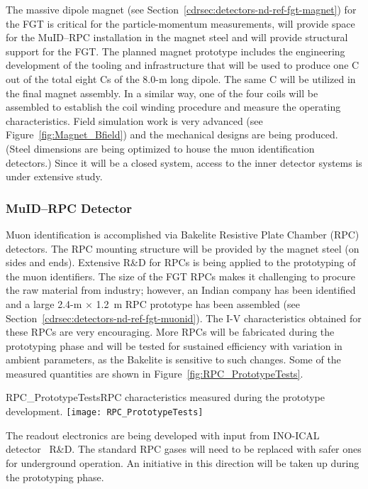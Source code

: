 The massive dipole magnet (see Section~\ref{cdrsec:detectors-nd-ref-fgt-magnet}) for the FGT 
is critical for the particle-momentum measurements, will 
provide space for the MuID--RPC installation in the magnet steel
and will provide structural support for the FGT. 
The planned magnet prototype
includes the engineering development of the tooling and
infrastructure 
that will be used to produce one C out of the total eight Cs of the
8.0-m long dipole.  The same C will be utilized in the final magnet
assembly. In a similar way, one of the four coils
will be assembled to establish the coil winding procedure and measure the
operating characteristics.  Field simulation work is very
advanced (see Figure~\ref{fig:Magnet_Bfield}) and the mechanical
designs are being produced.  (Steel dimensions are being optimized to house the muon
identification detectors.) Since it will be a
closed system, access to the inner detector systems is under extensive
study.


\subsubsection{MuID--RPC Detector}

Muon identification is accomplished via Bakelite Resistive Plate
Chamber (RPC) detectors.  The RPC mounting structure will be provided
by the magnet steel (on sides and ends).  Extensive R\&D for RPCs is
being applied to the prototyping of the muon identifiers. The size of
the FGT RPCs makes it challenging to procure the raw material from
industry; however, an Indian company has been identified and a
large 2.4-m $\times$ 1.2~m RPC prototype has been assembled (see
Section~\ref{cdrsec:detectors-nd-ref-fgt-muonid}). The I-V
characteristics obtained for these RPCs are very encouraging. More
RPCs will be fabricated during the prototyping phase and will be
tested for sustained efficiency with variation in ambient parameters,
as the Bakelite is sensitive to such changes. Some of the measured
quantities are shown in Figure~\ref{fig:RPC_PrototypeTests}.  
\begin{cdrfigure}
{RPC_PrototypeTests}{RPC characteristics measured during the prototype development.}
\texttt{[image: RPC\_PrototypeTests]}
\end{cdrfigure}
The readout electronics are being developed with input from INO-ICAL
detector~\cite{1748-0221-7-10-P10003} R\&D. The standard RPC gases
will need to be replaced with safer ones for underground operation.
An initiative in this direction will be taken up during the
prototyping phase.



